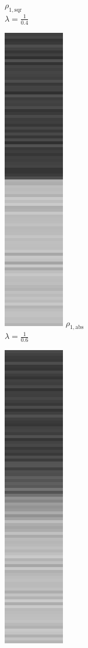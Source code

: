 \documentclass[onecolumn,final,a4paper,13pt,reqno]{siamart}
\begin{document}
\begin{figure}[t]
\begin{subfigure}[t]{0.08\textwidth}
		\scriptsize $\rho_{1,\text{sqr}}$\\[2px]
		\scriptsize $\lambda = \frac{1}{0.4}$
	\end{subfigure}
	\begin{subfigure}[t]{0.08\textwidth}
		\includegraphics[scale=0.3]{pictures/denoising/signal/ipiano_absolute_06.png}
		\scriptsize $\rho_{1,\text{abs}}$\\[2px]
		\scriptsize $\lambda = \frac{1}{0.6}$
	\end{subfigure}
	\begin{subfigure}[t]{0.08\textwidth}
		\includegraphics[scale=0.3]{pictures/denoising/signal/ipiano_squared_06.png}

\end{subfigure}
\end{figure}
\end{document}

